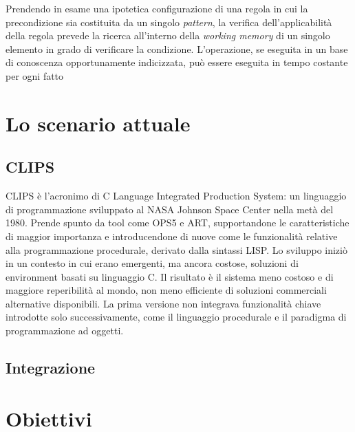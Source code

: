 Prendendo in esame una ipotetica configurazione di una regola in cui la precondizione sia costituita da un singolo \emph{pattern}, la verifica dell'applicabilità della regola prevede la ricerca all'interno della \emph{working memory} di un singolo elemento in grado di verificare la condizione. L'operazione, se eseguita in un base di conoscenza opportunamente indicizzata, può essere eseguita in tempo costante per ogni fatto \cite{russellnorvig2009}




\section{Lo scenario attuale}

\subsection{CLIPS}
CLIPS è l'acronimo di C Language Integrated Production System: un linguaggio di programmazione sviluppato al NASA Johnson Space Center nella metà del 1980. Prende spunto da tool come OPS5 e ART, supportandone le caratteristiche di maggior importanza e introducendone di nuove come le funzionalità relative alla programmazione procedurale, derivato dalla sintassi LISP. Lo sviluppo iniziò in un contesto in cui erano emergenti, ma ancora costose, soluzioni di environment basati su linguaggio C. Il risultato è il sistema meno costoso e di maggiore reperibilità al mondo, non meno efficiente di soluzioni commerciali alternative disponibili. La prima versione non integrava funzionalità chiave introdotte solo successivamente, come il linguaggio procedurale e il paradigma di programmazione ad oggetti.


\subsection{Integrazione}

\section{Obiettivi}